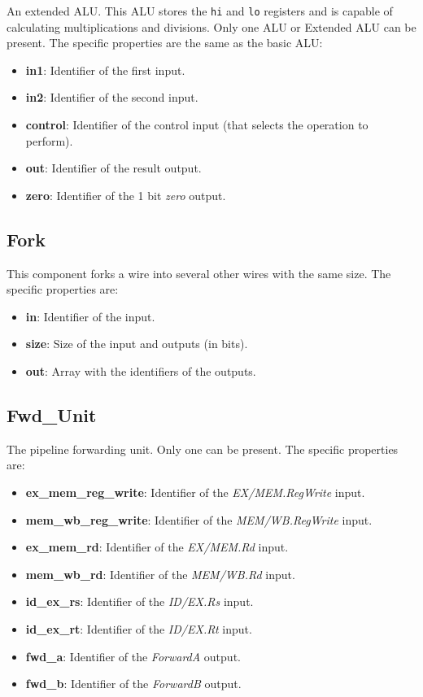\documentclass[11pt,a4paper,twoside,titlepage]{report}
\begin{document}
An extended ALU. This ALU stores the \verb+hi+ and \verb+lo+ registers and is
capable of calculating multiplications and divisions.
Only one ALU or Extended ALU can be present. The specific properties are the same
as the basic ALU:
\begin{itemize}
	\item \textbf{in1}: Identifier of the first input.
	\item \textbf{in2}: Identifier of the second input.
	\item \textbf{control}: Identifier of the control input (that selects the operation
		to perform).
	\item \textbf{out}: Identifier of the result output.
	\item \textbf{zero}: Identifier of the 1 bit \emph{zero} output.
\end{itemize}

\subsection{Fork}

This component forks a wire into several other wires with the same size.
The specific properties are:
\begin{itemize}
	\item \textbf{in}: Identifier of the input.
	\item \textbf{size}: Size of the input and outputs (in bits).
	\item \textbf{out}: Array with the identifiers of the outputs.
\end{itemize}

\subsection{Fwd\_Unit}

The pipeline forwarding unit. Only one can be present.
The specific properties are:
\begin{itemize}
	\item \textbf{ex\_mem\_reg\_write}: Identifier of the \emph{EX/MEM.RegWrite} input.
	\item \textbf{mem\_wb\_reg\_write}: Identifier of the \emph{MEM/WB.RegWrite} input.
	\item \textbf{ex\_mem\_rd}: Identifier of the \emph{EX/MEM.Rd} input.
	\item \textbf{mem\_wb\_rd}: Identifier of the \emph{MEM/WB.Rd} input.
	\item \textbf{id\_ex\_rs}: Identifier of the \emph{ID/EX.Rs} input.
	\item \textbf{id\_ex\_rt}: Identifier of the \emph{ID/EX.Rt} input.
	\item \textbf{fwd\_a}: Identifier of the \emph{ForwardA} output.
	\item \textbf{fwd\_b}: Identifier of the \emph{ForwardB} output.
\end{itemize}
\end{document}
